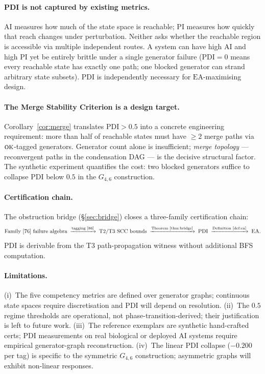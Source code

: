 \documentclass[11pt,letterpaper]{article}
\theoremstyle{plain}
\theoremstyle{definition}
\theoremstyle{remark}
\newcommand{\PDI}{\mathrm{PDI}}
\newcommand{\AI}{\mathrm{AI}}
\newcommand{\PI}{\mathrm{PI}}
\newcommand{\EA}{\mathrm{EA}}
\newcommand{\OK}{\textup{\textsc{ok}}}
\begin{document}
\paragraph{PDI is not captured by existing metrics.}
$\AI$ measures how much of the state space is reachable;
$\PI$ measures how quickly that reach changes under perturbation.
Neither asks whether the reachable region is accessible via multiple
independent routes.
A system can have high $\AI$ and high $\PI$
yet be entirely brittle under a single generator failure
($\PDI = 0$ means every reachable state has exactly one path;
one blocked generator can strand arbitrary state subsets).
$\PDI$ is independently necessary for $\EA$-maximising design.

\paragraph{The Merge Stability Criterion is a design target.}
Corollary~\ref{cor:merge} translates $\PDI > 0.5$ into a concrete
engineering requirement:
more than half of reachable states must have $\geq 2$ merge paths
via $\OK$-tagged generators.
Generator count alone is insufficient;
\emph{merge topology} --- reconvergent paths in the condensation DAG ---
is the decisive structural factor.
The synthetic experiment quantifies the cost: two blocked generators
suffice to collapse $\PDI$ below $0.5$ in the $G_{4,6}$ construction.

\paragraph{Certification chain.}
The obstruction bridge (\S\ref{sec:bridge}) closes a three-family
certification chain:
\[
  \text{Family [76] failure algebra}
  \;\xrightarrow{\text{tagging [86]}}\;
  \text{T2/T3 SCC bounds}
  \;\xrightarrow{\text{Theorem~\ref{thm:bridge}}}\;
  \PDI
  \;\xrightarrow{\text{Definition~\ref{def:ea}}}\;
  \EA.
\]
$\PDI$ is derivable from the T3 path-propagation witness without
additional BFS computation.

\paragraph{Limitations.}
(i)~The five competency metrics are defined over generator graphs;
continuous state spaces require discretisation and $\PDI$ will depend
on resolution.
(ii)~The $0.5$ regime thresholds are operational, not phase-transition-derived;
their justification is left to future work.
(iii)~The reference exemplars are synthetic hand-crafted certs;
$\PDI$ measurements on real biological or deployed AI systems require
empirical generator-graph reconstruction.
(iv)~The linear $\PDI$ collapse ($-0.200$ per tag) is specific to the
symmetric $G_{4,6}$ construction; asymmetric graphs will exhibit
non-linear responses.
\end{document}
